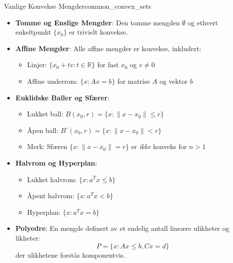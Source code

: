 \begin{example}{Vanlige Konvekse Mengder}{common_convex_sets}
	\begin{itemize}
		\item \textbf{Tomme og Enslige Mengder}: Den tomme mengden $\emptyset$ og ethvert enkeltpunkt $\{x_0\}$ er trivielt konvekse.

		\item \textbf{Affine Mengder}: Alle affine mengder er konvekse, inkludert:
		      \begin{itemize}
			      \item Linjer: $\{x_0 + tv : t \in \mathbb{R}\}$ for fast $x_0$ og $v \neq 0$
			      \item Affine underrom: $\{x : Ax = b\}$ for matrise $A$ og vektor $b$
		      \end{itemize}

		\item \textbf{Euklidske Baller og Sfærer}:
		      \begin{itemize}
			      \item Lukket ball: $B(x_0, r) = \{x : \|x - x_0\| \leq r\}$
			      \item Åpen ball: $B^\circ(x_0, r) = \{x : \|x - x_0\| < r\}$
			      \item Merk: Sfæren $\{x : \|x - x_0\| = r\}$ er \emph{ikke} konveks for $n > 1$
		      \end{itemize}

		\item \textbf{Halvrom og Hyperplan}:
		      \begin{itemize}
			      \item Lukket halvrom: $\{x : a^T x \leq b\}$
			      \item Åpent halvrom: $\{x : a^T x < b\}$
			      \item Hyperplan: $\{x : a^T x = b\}$
		      \end{itemize}

		\item \textbf{Polyedre}: En mengde definert av et endelig antall lineære ulikheter og likheter:
		      \[
			      P = \{x : Ax \leq b, Cx = d\}
		      \]
		      der ulikhetene forstås komponentvis.
	\end{itemize}

\end{example}

